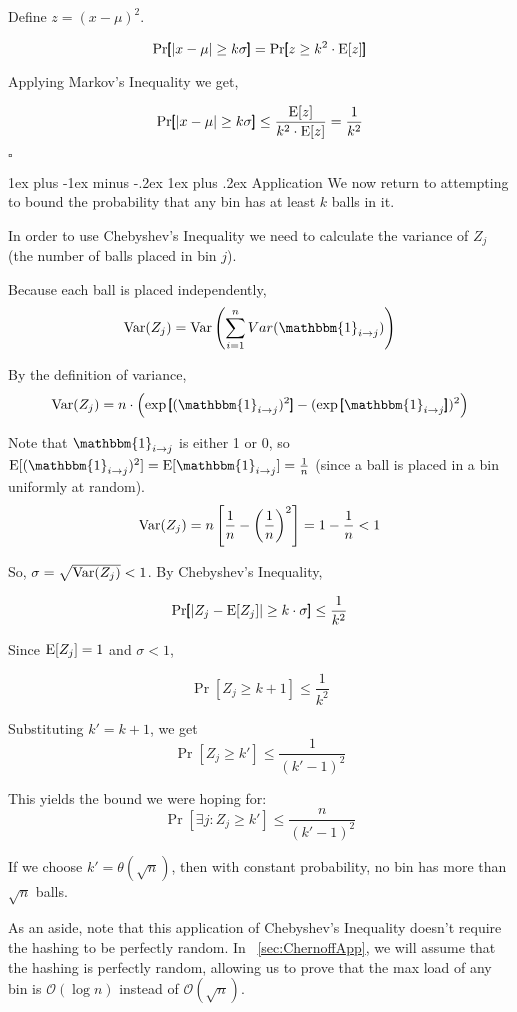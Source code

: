\documentclass[11pt]{article}
\makeatletter
\renewcommand{\subsubsection}{\@startsection{subsubsection}{3}{0mm}%
                                   {1ex plus -1ex minus -.2ex}%
                                   {1ex plus .2ex}%
                                   {\normalfont\normalsize\bfseries}}
\newcommand{\pr}{{\bf {\rm Pr}}}
\newcommand{\expc}{{\bf {\rm E}}}
\newcommand{\var}{{\bf {\rm Var}}}
\newcommand*{\QEDB}{\null\nobreak\hfill\ensuremath{\square}}
\newcommand{\bigo}{\mathcal{O}}
\makeatother
\begin{document}
Define $z = (x - \mu)^2$.

\[ \pr \pmb{[} |x - \mu| \geq k \sigma \pmb{]} = \pr \pmb{[} z \geq k^2 \cdot \expc[z] \pmb{]} \]

Applying Markov's Inequality we get,

\[ \pr \pmb{[} |x - \mu| \geq k \sigma \pmb{]} \leq \frac{\expc[z]}{k^2 \cdot \expc[z]} = \frac{1}{k^2} \]

\QEDB

\subsubsection{Application}
We now return to attempting to bound the probability that any bin has at least $k$ balls in it.

In order to use Chebyshev's Inequality we need to calculate the variance of $Z_j$ (the number of balls placed in bin $j$).

Because each ball is placed independently,
\[ \var(Z_j) = \var \left (\sum_{i=1}^{n} Var(\mathbbm{1}_{i \rightarrow j})\right) \]

By the definition of variance,
\[ \var(Z_j) = n \cdot \left(\exp\pmb{[}(\mathbbm{1}_{i \rightarrow j})^2\pmb{]} - (\exp\pmb{[}\mathbbm{1}_{i \rightarrow j}  \pmb{]})^2 \right) \]

Note that $\mathbbm{1}_{i \rightarrow j}$ is either 1 or 0, so $\expc[(\mathbbm{1}_{i \rightarrow j})^2] = \expc[\mathbbm{1}_{i \rightarrow j}] = \frac{1}{n}$ (since a ball is placed in a bin uniformly at random).
\[ \var(Z_j) = n \left[\frac{1}{n} - \left(\frac{1}{n}\right)^2 \right] = 1 - \frac{1}{n} < 1 \]

So, $\sigma = \sqrt{\var(Z_j)} < 1$. By Chebyshev's Inequality,

\[ \pr \pmb{[}|Z_j - \expc[Z_j]| \geq k \cdot \sigma\pmb{]} \leq \frac{1}{k^2} \]

Since $\expc[Z_j] = 1$ and $\sigma < 1$,

\[ \Pr [Z_j \geq k+1] \leq \frac{1}{k^2} \]

Substituting $k' = k+1$, we get
\[ \Pr [Z_j \geq k'] \leq \frac{1}{(k' - 1)^2} \]

This yields the bound we were hoping for:
\[ \Pr [\exists j: Z_j \geq k'] \leq \frac{n}{(k' - 1)^2} \]

If we choose $k' = \theta(\sqrt{n})$, then with constant probability, no bin has more than $\sqrt{n}$ balls.

As an aside, note that this application of Chebyshev's Inequality doesn't require the hashing to be perfectly random. In ~\ref{sec:ChernoffApp}, we will assume that the hashing is perfectly random, allowing us to prove that the max load of any bin is $\bigo(\log n)$ instead of $\bigo(\sqrt{n})$.
\end{document}
